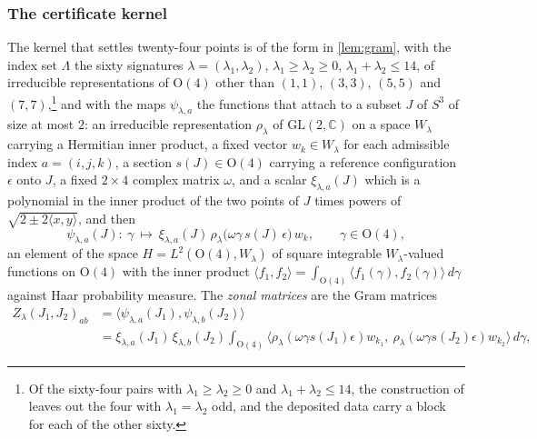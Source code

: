 \documentclass[11pt,reqno]{amsart}
\renewcommand{\_}{\origunderscore\allowbreak}
\numberwithin{equation}{section}
\theoremstyle{plain}
\theoremstyle{definition}
\theoremstyle{remark}
\begin{document}
\subsubsection{The certificate kernel}
\label{sec:certificate-kernel}

The kernel that settles twenty-four points is of the form in
\cref{lem:gram}, with the index set $\Lambda$ the sixty signatures
$\lambda=(\lambda_1,\lambda_2)$, $\lambda_1\ge\lambda_2\ge0$,
$\lambda_1+\lambda_2\le14$, of irreducible representations of
$\mathrm O(4)$ other than $(1,1)$, $(3,3)$, $(5,5)$ and $(7,7)$,\footnote{Of
  the sixty-four pairs with $\lambda_1\ge\lambda_2\ge0$ and
  $\lambda_1+\lambda_2\le14$, the construction of \cite[\S3]{LLM24} leaves
  out the four with $\lambda_1=\lambda_2$ odd, and the deposited data
  carry a block for each of the other sixty.} and with the maps $\psi_{\lambda,a}$ the functions that
\cite[\S2--3]{LLM24} attach to a subset $J$ of $S^3$ of size at most
$2$: an irreducible representation $\rho_\lambda$ of
$\mathrm{GL}(2,\mathbb C)$ on a space $W_\lambda$ carrying a Hermitian inner
product, a fixed vector $w_k\in W_\lambda$ for each admissible index
$a=(i,j,k)$, a section $s(J)\in\mathrm O(4)$ carrying a reference
configuration $\epsilon$ onto $J$, a fixed $2\times4$ complex matrix
$\omega$, and a scalar $\xi_{\lambda,a}(J)$ which is a polynomial in the
inner product of the two points of $J$ times powers of
$\sqrt{2\pm2\langle x,y\rangle}$, and then
\begin{equation}\label{eq:psi}
  \psi_{\lambda,a}(J)\colon\ \gamma\ \longmapsto\ \xi_{\lambda,a}(J)\,
  \rho_\lambda\bigl(\omega\gamma\,s(J)\,\epsilon\bigr)\,w_k ,
  \qquad \gamma\in\mathrm O(4),
\end{equation}
an element of the space $H=L^2(\mathrm O(4),W_\lambda)$ of square
integrable $W_\lambda$-valued functions on $\mathrm O(4)$ with the inner
product $\langle f_1,f_2\rangle=\int_{\mathrm O(4)}\langle f_1(\gamma),f_2(\gamma)\rangle\,d\gamma$
against Haar probability measure. The \emph{zonal matrices} are the Gram
matrices
\begin{equation}\label{eq:zonal}
\begin{aligned}
  Z_\lambda(J_1,J_2)_{ab}&=\bigl\langle\psi_{\lambda,a}(J_1),\psi_{\lambda,b}(J_2)\bigr\rangle\\
  &=\xi_{\lambda,a}(J_1)\,\xi_{\lambda,b}(J_2)\int_{\mathrm O(4)}
  \bigl\langle\rho_\lambda(\omega\gamma s(J_1)\epsilon)w_{k_1},\ \rho_\lambda(\omega\gamma s(J_2)\epsilon)w_{k_2}\bigr\rangle\,d\gamma ,
\end{aligned}
\end{equation}
\end{document}

